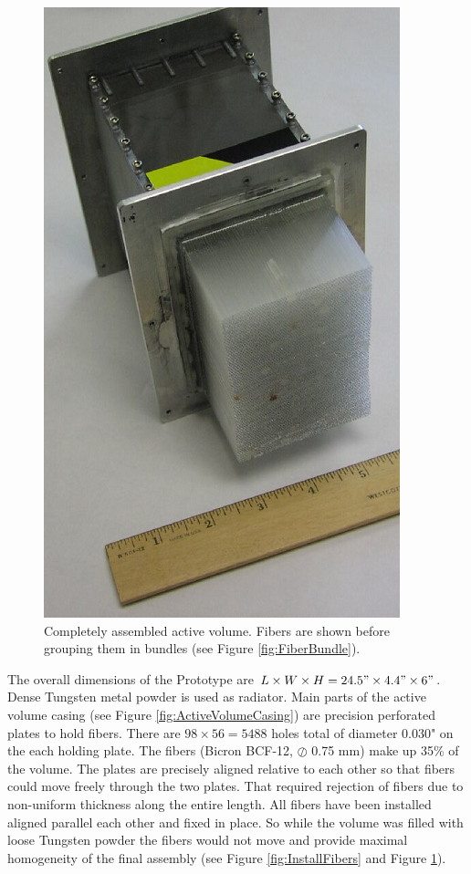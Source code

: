 \begin{figure}[h]
\centering
\includegraphics[width=0.65\linewidth]{images/Fig5_CompleteAssemble_Resize.png} 
    \caption{Completely assembled active volume. Fibers are shown before grouping them in bundles (see Figure \ref{fig:FiberBundle}).} 
    \label{fig:CompleteAssemble}
\end{figure}

The overall dimensions of the Prototype are $L \times W \times H = 24.5" \times 4.4" \times 6"$. Dense Tungsten metal powder is used as radiator. Main parts of the active volume casing (see Figure \ref{fig:ActiveVolumeCasing}) are precision perforated plates to hold fibers. There are $98 \times 56 = 5488$ holes total of diameter 0.030" on the each holding plate. The fibers (Bicron BCF-12, $\oslash$ 0.75 mm) make up 35\% of the volume. The plates are precisely aligned relative to each other so that fibers could move freely through the two plates. That required rejection of fibers due to non-uniform thickness along the entire length. All fibers have been installed aligned parallel each other and fixed in place. So while the volume was filled with loose Tungsten powder the fibers would not move and provide maximal homogeneity of the final assembly (see Figure \ref{fig:InstallFibers} and Figure \ref{fig:CompleteAssemble}).

